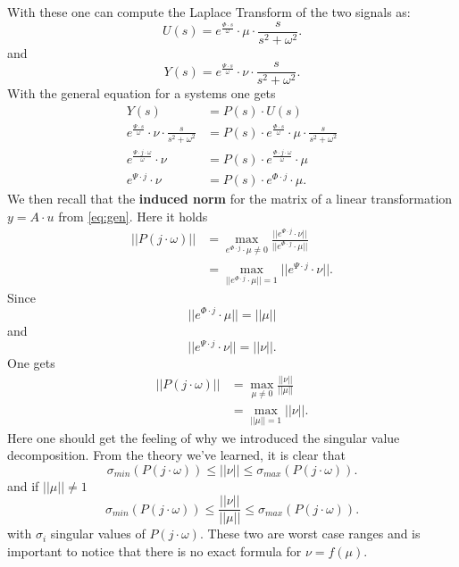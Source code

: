\documentclass[a4paper,12 pt]{article}
\numberwithin{equation}{section}
\theoremstyle{definition}
\theoremstyle{remark}
\theoremstyle{definition}
\theoremstyle{definition}
\theoremstyle{definition}
\theoremstyle{remark}
\begin{document}
With these one can compute the Laplace Transform of the two signals as:
\begin{equation}
U(s)=e^{\frac{\Phi \cdot s}{\omega}}\cdot \mu \cdot \frac{s}{s^2+\omega^2}.
\end{equation}
and
\begin{equation}
Y(s)=e^{\frac{\Psi \cdot s}{\omega}}\cdot \nu \cdot \frac{s}{s^2+\omega^2}.
\end{equation}
With the general equation for a systems one gets
\begin{equation}
\begin{split}
Y(s)&=P(s)\cdot U(s)\\
e^{\frac{\Psi \cdot s}{\omega}}\cdot \nu \cdot \frac{s}{s^2+\omega^2}&=P(s)\cdot e^{\frac{\Phi \cdot s}{\omega}}\cdot \mu \cdot \frac{s}{s^2+\omega^2}\\
e^{\frac{\Psi \cdot j \cdot \omega}{\omega}}\cdot \nu &=P(s)\cdot e^{\frac{\Phi \cdot j\cdot \omega}{\omega}}\cdot \mu\\
e^{\Psi \cdot j}\cdot \nu &=P(s)\cdot e^{\Phi \cdot j}\cdot \mu.
\end{split}
\end{equation}
We then recall that the \textbf{induced norm} for the matrix of a linear transformation $y=A\cdot u$ from \ref{eq:gen}. Here it holds
\begin{equation}
\begin{split}
||P(j\cdot \omega)||&=\max_{e^{\Phi \cdot j}\cdot \mu \neq 0}\frac{||e^{\Psi \cdot j}\cdot \nu||}{||e^{\Phi \cdot j}\cdot \mu||}\\
&=\max_{||e^{\Phi \cdot j}\cdot \mu|| =1}||e^{\Psi \cdot j}\cdot \nu||.
\end{split}
\end{equation}
Since
\begin{equation}
||e^{\Phi \cdot j}\cdot \mu||=||\mu||
\end{equation}
and
\begin{equation}
||e^{\Psi \cdot j}\cdot \nu||=||\nu||.
\end{equation}
One gets
\begin{equation}
\begin{split}
||P(j\cdot \omega)||&=\max_{\mu \neq 0}\frac{ ||\nu||}{||\mu||}\\
&=\max_{||\mu||=1}||\nu||.\end{split}
\end{equation}
Here one should get the feeling of why we introduced the singular value decomposition. From the theory we've learned, it is clear that
\begin{equation}
\sigma_{min}(P(j\cdot \omega))\leq ||\nu||\leq \sigma_{max}(P(j\cdot \omega)).
\end{equation}
and if $||\mu|| \neq 1$
\begin{equation}
\sigma_{min}(P(j\cdot \omega))\leq \frac{||\nu||}{||\mu||}\leq \sigma_{max}(P(j\cdot \omega)).
\end{equation}
with $\sigma_i$ singular values of $P(j\cdot \omega)$.  These two are worst case ranges and is important to notice that there is no exact formula for $\nu=f(\mu)$.
\end{document}
